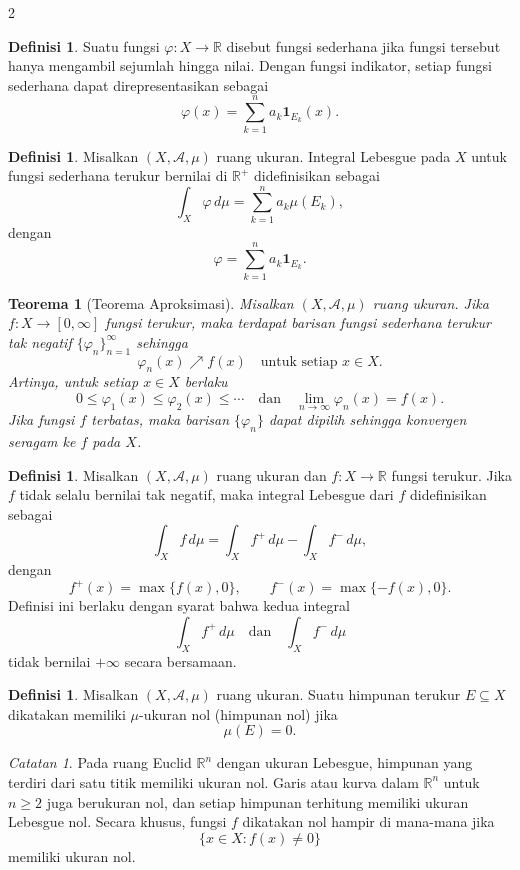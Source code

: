 \documentclass[a4paper,extrafontsizes, 9pt]{memoir}
\theoremstyle{definition}
\newtheorem{definisi}[kalstok]{Definisi}
\theoremstyle{plain}
\newtheorem{teorema}[kalstok]{Teorema}
\theoremstyle{remark}
\newtheorem{catatan}[kalstok]{Catatan}
\begin{document}
\begin{multicols}{2}
  \begin{definisi}
    Suatu fungsi $\varphi:X\to\mathbb{R}$ disebut fungsi sederhana jika fungsi tersebut hanya mengambil
    sejumlah hingga nilai. Dengan fungsi indikator, setiap fungsi sederhana dapat direpresentasikan sebagai
    \[\varphi(x)=\sum_{k=1}^{n}a_k\mathbf{1}_{E_k}(x).\]
  \end{definisi}

  \begin{definisi}
    Misalkan $(X,\mathcal{A},\mu)$ ruang ukuran. Integral Lebesgue pada $X$ untuk fungsi sederhana terukur
    bernilai di $\mathbb{R}^{+}$ didefinisikan sebagai
    \[\int_X\varphi\,d\mu=\sum_{k=1}^{n}a_k\mu(E_k),\]
    dengan
    \[\varphi=\sum_{k=1}^{n}a_k\mathbf{1}_{E_k}.\]
  \end{definisi}

  \begin{teorema}[Teorema Aproksimasi]
    Misalkan $(X,\mathcal{A},\mu)$ ruang ukuran. Jika $f:X\to[0,\infty]$ fungsi terukur,
    maka terdapat barisan fungsi sederhana terukur tak negatif $\{\varphi_n\}_{n=1}^{\infty}$ sehingga
    \[\varphi_n(x)\nearrow f(x)\quad\text{untuk setiap }x\in X.\]
    Artinya, untuk setiap $x\in X$ berlaku
    \[0\le\varphi_1(x)\le\varphi_2(x)\le\cdots\quad\text{dan}\quad\lim_{n\to\infty}\varphi_n(x)=f(x).\]
    Jika fungsi $f$ terbatas, maka barisan $\{\varphi_n\}$ dapat dipilih sehingga konvergen seragam ke $f$ pada $X$.
  \end{teorema}

  \begin{definisi}
    Misalkan $(X,\mathcal{A},\mu)$ ruang ukuran dan $f:X\to\mathbb{R}$ fungsi terukur.
    Jika $f$ tidak selalu bernilai tak negatif, maka integral Lebesgue dari $f$ didefinisikan sebagai
    \[\int_X f\,d\mu=\int_X f^{+}\,d\mu-\int_X f^{-}\,d\mu,\]
    dengan
    \[f^{+}(x)=\max\{f(x),0\},\qquad f^{-}(x)=\max\{-f(x),0\}.\]
    Definisi ini berlaku dengan syarat bahwa kedua integral
    \[\int_X f^{+}\,d\mu\quad\text{dan}\quad\int_X f^{-}\,d\mu\]
    tidak bernilai $+\infty$ secara bersamaan.
  \end{definisi}

  \begin{definisi}
    Misalkan $(X,\mathcal{A},\mu)$ ruang ukuran. Suatu himpunan terukur $E\subseteq X$ dikatakan
    memiliki $\mu$-ukuran nol (himpunan nol) jika
    \[\mu(E)=0.\]
  \end{definisi}

  \begin{catatan}
    Pada ruang Euclid $\mathbb{R}^{n}$ dengan ukuran Lebesgue, himpunan yang terdiri dari satu titik memiliki ukuran nol.
    Garis atau kurva dalam $\mathbb{R}^{n}$ untuk $n\ge 2$ juga berukuran nol, dan setiap himpunan terhitung memiliki
    ukuran Lebesgue nol. Secara khusus, fungsi $f$ dikatakan nol hampir di mana-mana jika
    \[\{x\in X:f(x)\neq 0\}\]
    memiliki ukuran nol.
  \end{catatan}


\end{multicols}
\end{document}

